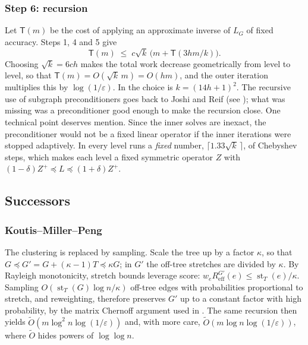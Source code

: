 \documentclass[11pt]{amsart}
\theoremstyle{definition}
\theoremstyle{remark}
\newcommand{\st}{\operatorname{st}}
\newcommand{\Reff}{R_{\mathrm{eff}}}
\newcommand{\Ot}{\widetilde{O}}
\newcommand{\lo}{\preccurlyeq}
\newcommand{\eps}{\varepsilon}
\begin{document}
\subsubsection*{Step 6: recursion}
Let $\mathsf T(m)$ be the cost of applying an approximate inverse of $L_G$ of fixed accuracy. Steps 1, 4 and 5 give
\[
\mathsf T(m)\;\le\;c\sqrt k\,\bigl(m+\mathsf T(3hm/k)\bigr).
\]
Choosing $\sqrt k=6ch$ makes the total work decrease geometrically from level to level, so that $\mathsf T(m)=O(\sqrt k\,m)=O(hm)$, and the outer iteration multiplies this by $\log(1/\eps)$.
In \cite{STsolve} the choice is $k=(14h+1)^2$. The recursive use of subgraph preconditioners goes back to Joshi and Reif (see \cite[Section~2.2]{STsolve}); what was missing was a preconditioner good enough to make the recursion close.
One technical point deserves mention. Since the inner solves are inexact, the preconditioner would not be a fixed linear operator if the inner iterations were stopped adaptively. In \cite{STsolve} every level runs a \emph{fixed} number, $\lceil1.33\sqrt k\,\rceil$, of Chebyshev steps,
which makes each level a fixed symmetric operator $Z$ with $(1-\delta)Z^{+}\lo L\lo(1+\delta)Z^{+}$.

\subsection{Successors}

\subsubsection*{Koutis--Miller--Peng \cite{KMP10,KMP11}}
The clustering is replaced by sampling. Scale the tree up by a factor $\kappa$, so that $G\lo G'=G+(\kappa-1)T\lo\kappa G$; in $G'$ the off-tree stretches are divided by $\kappa$.
By Rayleigh monotonicity, stretch bounds leverage score: $w_e\Reff^{G'}(e)\le\st_T(e)/\kappa$. Sampling $O(\st_T(G)\log n/\kappa)$ off-tree edges with probabilities proportional to stretch, and reweighting, therefore preserves $G'$ up to a constant factor with
high probability, by the matrix Chernoff argument used in \cite{SS11}. The same recursion then yields $\Ot(m\log^2n\log(1/\eps))$ and, with more care, $\Ot(m\log n\log(1/\eps))$, where $\Ot$ hides powers of $\log\log n$.
\end{document}
